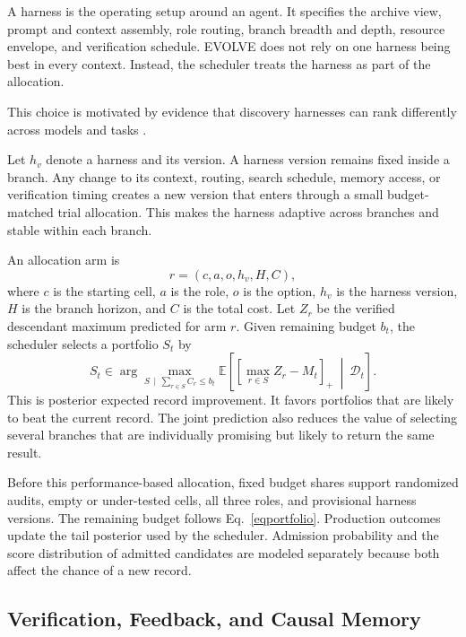 A harness is the operating setup around an agent. It specifies the archive view, prompt and context assembly, role routing, branch breadth and depth, resource envelope, and verification schedule. EVOLVE does not rely on one harness being best in every context. Instead, the scheduler treats the harness as part of the allocation.

This choice is motivated by evidence that discovery harnesses can rank differently across models and tasks \citep{gupta2026}.

Let $h_v$ denote a harness and its version. A harness version remains fixed inside a branch. Any change to its context, routing, search schedule, memory access, or verification timing creates a new version that enters through a small budget-matched trial allocation. This makes the harness adaptive across branches and stable within each branch.

An allocation arm is
\begin{equation}
r=(c,a,o,h_v,H,C),
\label{eqarm}
\end{equation}
where $c$ is the starting cell, $a$ is the role, $o$ is the option, $h_v$ is the harness version, $H$ is the branch horizon, and $C$ is the total cost. Let $Z_r$ be the verified descendant maximum predicted for arm $r$. Given remaining budget $b_t$, the scheduler selects a portfolio $S_t$ by
\begin{equation}
S_t
\in
\arg\max_{S\,\mid\,\sum_{r\in S}C_r\leq b_t}
\mathbb E\left[
\left[
\max_{r\in S}Z_r-M_t
\right]_+
\ \middle|\
\mathcal D_t
\right].
\label{eqportfolio}
\end{equation}
This is posterior expected record improvement. It favors portfolios that are likely to beat the current record. The joint prediction also reduces the value of selecting several branches that are individually promising but likely to return the same result.

Before this performance-based allocation, fixed budget shares support randomized audits, empty or under-tested cells, all three roles, and provisional harness versions. The remaining budget follows Eq.~\eqref{eqportfolio}. Production outcomes update the tail posterior used by the scheduler. Admission probability and the score distribution of admitted candidates are modeled separately because both affect the chance of a new record.

\subsection{Verification, Feedback, and Causal Memory}
\label{secmemory}

